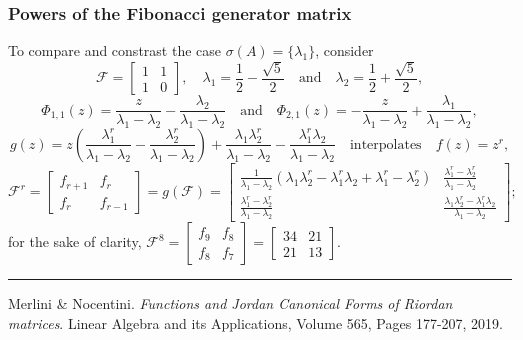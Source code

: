 \documentclass[9pt]{beamer}
\begin{document}
\begin{frame}[fragile]
\frametitle{Powers of the Fibonacci generator matrix}
To compare and constrast the case $\sigma(A)=\lbrace \lambda_{1} \rbrace$, consider
\begin{displaymath}
\mathcal{F} = \left[\begin{matrix}1 & 1\\1 & 0\end{matrix}\right],
\quad  \lambda_{1} =  \frac{1}{2}- \frac{\sqrt{5}}{2}
\quad\text{and}\quad \lambda_{2} = \frac{1}{2} + \frac{\sqrt{5}}{2},
\end{displaymath}
\begin{displaymath}
\Phi_{ 1, 1 }{\left (z \right )} = \frac{z}{\lambda_{1} - \lambda_{2}} - \frac{\lambda_{2}}{\lambda_{1} - \lambda_{2}}
\quad\text{and}\quad \Phi_{ 2, 1 }{\left (z \right )} = - \frac{z}{\lambda_{1} - \lambda_{2}} + \frac{\lambda_{1}}{\lambda_{1} - \lambda_{2}},
\end{displaymath}
\begin{displaymath}
g{\left (z \right )} = z \left(\frac{\lambda_{1}^{r}}{\lambda_{1} - \lambda_{2}} - \frac{\lambda_{2}^{r}}{\lambda_{1} - \lambda_{2}}\right) + \frac{\lambda_{1} \lambda_{2}^{r}}{\lambda_{1} - \lambda_{2}} - \frac{\lambda_{1}^{r} \lambda_{2}}{\lambda_{1} - \lambda_{2}}\quad\text{interpolates}\quad f(z)=z^{r},
\end{displaymath}
\begin{displaymath}
\mathcal{F}^{r} = \left[\begin{matrix}f_{r+1} & f_{r}\\f_{r} & f_{r-1}\end{matrix}\right] =g(\mathcal{F})=\left[\begin{matrix}\frac{1}{\lambda_{1} - \lambda_{2}} \left(\lambda_{1} \lambda_{2}^{r} - \lambda_{1}^{r} \lambda_{2} + \lambda_{1}^{r} - \lambda_{2}^{r}\right) & \frac{\lambda_{1}^{r} - \lambda_{2}^{r}}{\lambda_{1} - \lambda_{2}}\\\frac{\lambda_{1}^{r} - \lambda_{2}^{r}}{\lambda_{1} - \lambda_{2}} & \frac{\lambda_{1} \lambda_{2}^{r} - \lambda_{1}^{r} \lambda_{2}}{\lambda_{1} - \lambda_{2}}\end{matrix}\right];
\end{displaymath}
for the sake of clarity,
$\displaystyle\mathcal{F}^{8} = \left[\begin{matrix}f_{9} & f_{8}\\f_{8} & f_{7}\end{matrix}\right] = \left[\begin{matrix}34 & 21\\21 & 13\end{matrix}\right].$
\vfill
\noindent\rule{\textwidth}{0.1pt}
{\footnotesize
Merlini \& Nocentini. \textit{Functions and Jordan Canonical Forms of Riordan
matrices}. \newline Linear Algebra and its Applications, Volume 565, Pages 177-207, 2019.}
\end{frame}
\end{document}
